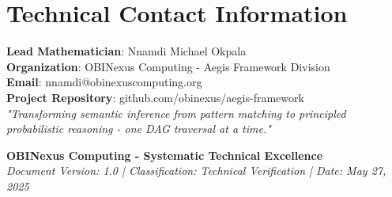 \documentclass[11pt,a4paper]{article}
\begin{document}
\section*{Technical Contact Information}

\textbf{Lead Mathematician}: Nnamdi Michael Okpala \\
\textbf{Organization}: OBINexus Computing - Aegis Framework Division \\
\textbf{Email}: nnamdi@obinexuscomputing.org \\
\textbf{Project Repository}: github.com/obinexus/aegis-framework \\

\textit{"Transforming semantic inference from pattern matching to principled probabilistic reasoning - one DAG traversal at a time."}

\vspace{1cm}
\textbf{OBINexus Computing - Systematic Technical Excellence} \\
\textit{Document Version: 1.0 | Classification: Technical Verification | Date: May 27, 2025}
\end{document}
